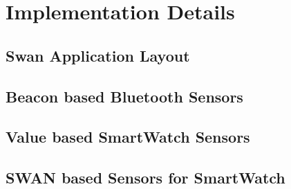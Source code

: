
\chapter{Implementation Details} %

\label{Chapter5} %



\section{Swan Application Layout}

\section{Beacon based Bluetooth Sensors}

\section{Value based SmartWatch Sensors}

\section{SWAN based Sensors for SmartWatch}

